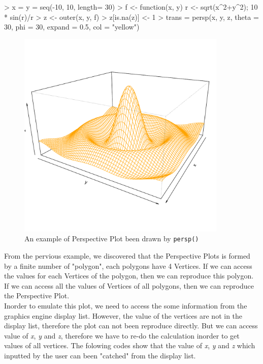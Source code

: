 \documentclass[a4paper,10pt]{article}
\begin{document}
\begin{Schunk}
\begin{Sinput}
> x = y = seq(-10, 10, length= 30)
> f <- function(x, y) { r <- sqrt(x^2+y^2); 10 * sin(r)/r }
> z <- outer(x, y, f)
> z[is.na(z)] <- 1
> trans = persp(x, y, z, theta = 30, phi = 30, expand = 0.5, col = "yellow")
\end{Sinput}
\end{Schunk}



\begin{figure}[h]
\begin{center}
  \includegraphics[height = 10cm, width = 10cm]{figure/standalone_1}
  \caption{An example of Perspective Plot been drawn by \texttt{persp()}}
  	\label{figure4}
\end{center}
\end{figure}

\newpage

From the pervious example, we discovered that the Perspective Plots is formed by a finite number of "polygon", each polygons have 4 Vertices. If we can access the values for each Vertices of the polygon, then we can reproduce this polygon. If we can access all the values of Vertices of all polygons, then we can reproduce the Perspective Plot. \\

Inorder to emulate this plot, we need to access the some information from the graphics engine display list. However, the value of the vertices are not in the display list, therefore the plot can not been reproduce directly. But we can access value of \emph{x}, \emph{y} and \emph{z}, therefore we have to re-do the calculation inorder to get values of all vertices. The folowing codes show that the value of \emph{x}, \emph{y} and \emph{z} which inputted by the user can been "catched" from the display list.
\end{document}
